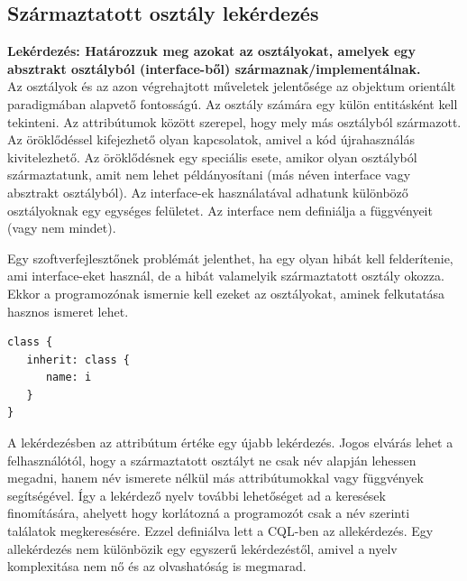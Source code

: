 \documentclass[a4paper,12pt]{report}
\begin{document}
\subsection{Származtatott osztály lekérdezés}
\textbf{Lekérdezés: Határozzuk meg azokat az osztályokat, amelyek egy absztrakt osztályból (interface-ből) származnak/implementálnak.}
\\
Az osztályok és az azon végrehajtott műveletek jelentősége az objektum orientált paradigmában alapvető fontosságú. Az osztály számára egy külön entitásként kell tekinteni. Az attribútumok között szerepel, hogy mely más osztályból származott. Az öröklődéssel kifejezhető olyan kapcsolatok, amivel a kód újrahasználás kivitelezhető. Az öröklődésnek egy speciális esete, amikor olyan osztályból származtatunk, amit nem lehet példányosítani (más néven interface vagy absztrakt osztályból). Az interface-ek használatával adhatunk különböző osztályoknak egy egységes felületet. Az interface nem definiálja a függvényeit (vagy nem mindet). 
\par Egy szoftverfejlesztőnek problémát jelenthet, ha egy olyan hibát kell felderítenie, ami interface-eket használ, de a hibát valamelyik származtatott osztály okozza. Ekkor a programozónak ismernie kell ezeket az osztályokat, aminek felkutatása hasznos ismeret lehet.
\begin{verbatim}
class {
   inherit: class { 
      name: i 
   }
}
\end{verbatim}
\par A lekérdezésben az attribútum értéke egy újabb lekérdezés. Jogos elvárás lehet a felhasználótól, hogy a származtatott osztályt ne csak név alapján lehessen megadni, hanem név ismerete nélkül más attribútumokkal vagy függvények segítségével. Így a lekérdező nyelv további lehetőséget ad a keresések finomítására, ahelyett hogy korlátozná a programozót csak a név szerinti találatok megkeresésére. Ezzel definiálva lett a CQL-ben az allekérdezés. Egy allekérdezés nem különbözik egy egyszerű lekérdezéstől, amivel a nyelv komplexitása nem nő és az olvashatóság is megmarad. 
\end{document}
